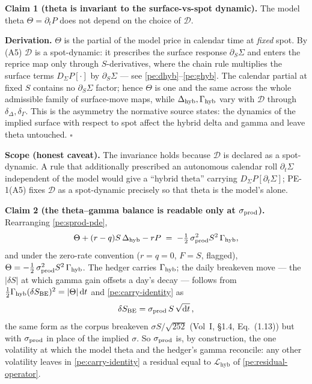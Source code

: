 \textbf{Claim 1 (theta is invariant to the surface-vs-spot dynamic).} The model
theta $\Theta=\partial_t P$ does not depend on the choice of $\mathcal{D}$.

\textbf{Derivation.} $\Theta$ is the partial of the model price in calendar time
at \emph{fixed} spot. By (A5) $\mathcal{D}$ is a spot-dynamic: it prescribes the
surface response $\partial_S\Sigma$ and enters the reprice map only through
$S$-derivatives, where the chain rule multiplies the surface terms
$D_\Sigma P[\cdot]$ by $\partial_S\Sigma$ --- see
\eqref{pe:dhyb}--\eqref{pe:ghyb}. The calendar partial at fixed $S$ contains no
$\partial_S\Sigma$ factor; hence $\Theta$ is one and the same across the whole
admissible family of surface-move maps, while $\Delta_{\mathrm{hyb}},\Gamma_{\mathrm{hyb}}$ vary with
$\mathcal{D}$ through $\delta_\Delta,\delta_\Gamma$. This is the asymmetry the
normative source states: the dynamics of the implied surface with respect to
spot affect the hybrid delta and gamma and leave theta untouched. $\square$

\textbf{Scope (honest caveat).} The invariance holds because $\mathcal{D}$ is
declared as a spot-dynamic. A rule that additionally prescribed an autonomous
calendar roll $\partial_t\Sigma$ independent of the model would give a
``hybrid theta'' carrying $D_\Sigma P[\partial_t\Sigma]$; PE-1(A5) fixes
$\mathcal{D}$ as a spot-dynamic precisely so that theta is the model's alone.

\textbf{Claim 2 (the theta--gamma balance is readable only at $\sigma_{\mathrm{prod}}$).}
Rearranging \eqref{pe:sprod-pde},
\begin{equation}\label{pe:carry-identity}
  \Theta + (r-q)S\,\Delta_{\mathrm{hyb}} - rP \;=\; -\tfrac12\,\sigma_{\mathrm{prod}}^2 S^2\,\Gamma_{\mathrm{hyb}} ,
\end{equation}
and under the zero-rate convention ($r=q=0$, $F=S$, flagged),
$\Theta = -\tfrac12\,\sigma_{\mathrm{prod}}^2 S^2\,\Gamma_{\mathrm{hyb}}$. The hedger carries $\Gamma_{\mathrm{hyb}}$; the daily
breakeven move --- the $|\delta S|$ at which gamma gain offsets a day's decay ---
follows from $\tfrac12\Gamma_{\mathrm{hyb}}(\delta S_{\mathrm{BE}})^2 = |\Theta|\,\mathrm{d} t$ and
\eqref{pe:carry-identity} as
\begin{equation}\label{pe:breakeven}
  \delta S_{\mathrm{BE}} = \sigma_{\mathrm{prod}}\,S\,\sqrt{\mathrm{d} t}\,,
\end{equation}
the same form as the corpus breakeven $\sigma S/\sqrt{252}$ (Vol~I, \S1.4,
Eq.~(1.13)) but with $\sigma_{\mathrm{prod}}$ in place of the implied $\sigma$. So $\sigma_{\mathrm{prod}}$ is,
by construction, the one volatility at which the model theta and the hedger's
gamma reconcile: any other volatility leaves in \eqref{pe:carry-identity} a
residual equal to $\mathcal{L}_{\mathrm{hyb}}$ of \eqref{pe:residual-operator}.


